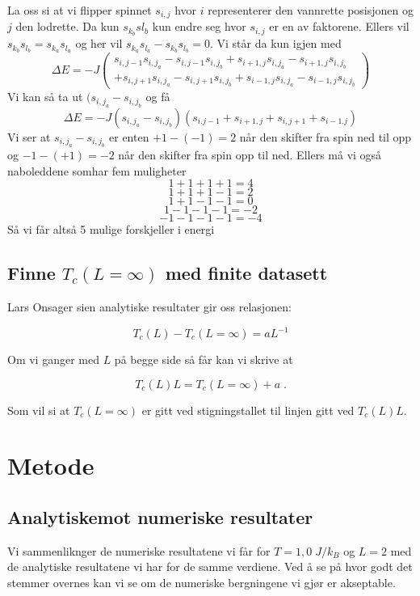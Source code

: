 \documentclass[reprint,english,notitlepage]{revtex4-2}  %
\begin{document}
La oss si at vi flipper spinnet $s_{i,j}$ hvor $i$ representerer den vannrette posisjonen og $j$ den lodrette. Da kun $s_{k_b}s{l_b}$ kun endre seg hvor $s_{i,j}$ er en av faktorene. Ellers vil $s_{k_b}s_{l_b}=s_{k_a}s_{l_a}$ og her vil $s_{k_a}s_{l_a}-s_{k_b}s_{l_b}=0$. Vi står da kun igjen med
$$
\Delta E= -J \begin{pmatrix} s_{i,j-1}s_{i,j_a}-s_{i,j-1}s_{i,j_b}+s_{i+1,j}s_{i,j_a}-s_{i+1,j}s_{i,j_b} \\+ s_{i,j+1}s_{i,j_a}-s_{i,j+1}s_{i,j_b}+s_{i-1,j}s_{i,j_a}-s_{i-1,j}s_{i,j_b}\end{pmatrix}
$$
Vi kan så ta ut $(s_{i,j_a}-s_{i,j_b}$ og få
$$
\Delta E=-J(s_{i,j_a}-s_{i,j_b})(
s_{i.j-1}+s_{i+1,j} +s_{i,j+1}+s_{i-1.j}
)
$$
Vi ser at $s_{i,j_a}-s_{i,j_b}$ er enten $+1-(-1)=2$ når den skifter fra spin ned til opp og $-1-(+1)=-2$ når den skifter fra spin opp til ned. Ellers må vi også naboleddene somhar fem muligheter
$$
1+1+1+1=4
$$
$$
1+1+1-1=2
$$
$$
1+1-1-1=0
$$
$$
1-1-1-1=-2
$$
$$
-1-1-1-1=-4
$$
Så vi får altså 5 mulige forskjeller i energi

\subsection*{Finne $T_c \left ( L = \infty \right ) $ med finite datasett}

Lars Onsager sien analytiske resultater gir oss relasjonen:

$$ T_c \left ( L \right ) - T_c \left ( L = \infty \right ) = aL^{-1}$$

Om vi ganger med $L$ på begge side så får kan vi skrive at

\begin{equation}\label{Tinf}
T_c \left (L \right ) L = T_c \left ( L = \infty \right ) + a \; .
\end{equation}

Som vil si at $T_c \left ( L = \infty \right ) $ er gitt ved stigningstallet til linjen gitt ved $T_c \left ( L \right ) L $.

\section{Metode}

\subsection*{Analytiskemot numeriske resultater}

Vi sammenliknger de numeriske resultatene vi får for $T = 1,0 \; J/k_B$ og $L =2$ med de analytiske resultatene vi har for de samme verdiene. Ved å se på hvor godt det stemmer overnes kan vi se om de numeriske bergningene vi gjør er akseptable.
\end{document}
